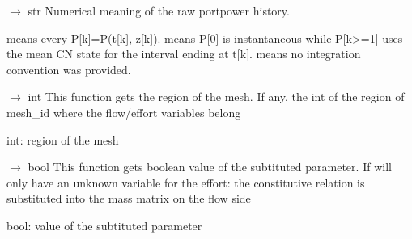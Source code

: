\documentclass[letterpaper,10pt,english]{sphinxmanual}
\begin{document}
\begin{fulllineitems}
\begin{fulllineitems}
\end{fulllineitems}


\begin{fulllineitems}
\label{\detokenize{scrimp:scrimp.port.Port.get_power_sampling}}
\pysigstartsignatures
\pysiglinewithargsret
{}
{}
{{ $\rightarrow$ str}}
\pysigstopsignatures
\sphinxAtStartPar
Numerical meaning of the raw port\sphinxhyphen{}power history.

\sphinxAtStartPar
{} means every P{[}k{]}=P(t{[}k{]}, z{[}k{]}).
 means P{[}0{]} is instantaneous while P{[}k\textgreater{}=1{]}
uses the mean CN state for the interval ending at t{[}k{]}.
 means no integration convention was provided.

\end{fulllineitems}


\begin{fulllineitems}
\label{\detokenize{scrimp:scrimp.port.Port.get_region}}
\pysigstartsignatures
\pysiglinewithargsret
{}
{}
{{ $\rightarrow$ int}}
\pysigstopsignatures
\sphinxAtStartPar
This function gets the region of the mesh.
If any, the int of the region of mesh\_id where the flow/effort variables belong
\begin{description}
\sphinxAtStartPar
int: region of the mesh

\end{description}

\end{fulllineitems}


\begin{fulllineitems}
\label{\detokenize{scrimp:scrimp.port.Port.get_substituted}}
\pysigstartsignatures
\pysiglinewithargsret
{}
{}
{{ $\rightarrow$ bool}}
\pysigstopsignatures
\sphinxAtStartPar
This function gets boolean value of the subtituted parameter.
If  will only have an unknown variable for the effort: the constitutive relation is substituted into the mass matrix on the flow side
\begin{description}
\sphinxAtStartPar
bool: value of the subtituted parameter


\end{description}
\end{fulllineitems}
\end{fulllineitems}
\end{document}
